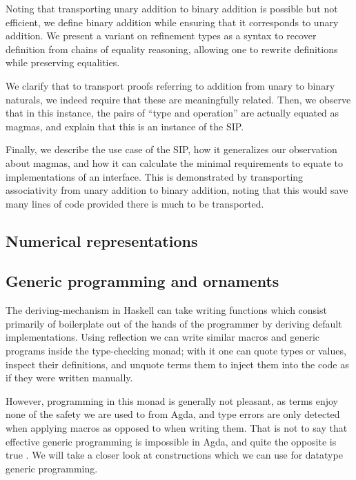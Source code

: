 Noting that transporting unary addition to binary addition is possible but not efficient, we define binary addition while ensuring that it corresponds to unary addition. We present a variant on refinement types as a syntax to recover definition from chains of equality reasoning, allowing one to rewrite definitions while preserving equalities.

We clarify that to transport proofs referring to addition from unary to binary naturals, we indeed require that these are meaningfully related. Then, we observe that in this instance, the pairs of ``type and operation'' are actually equated as magmas, and explain that this is an instance of the SIP.

Finally, we describe the use case of the SIP, how it generalizes our observation about magmas, and how it can calculate the minimal requirements to equate to implementations of an interface. This is demonstrated by transporting associativity from unary addition to binary addition, noting that this would save many lines of code provided there is much to be transported.






\subsection{Numerical representations}

\subsection{Generic programming and ornaments}\label{ssec:bg-desc}
The deriving-mechanism in Haskell can take writing functions which consist primarily of boilerplate out of the hands of the programmer by deriving default implementations. Using reflection we can write similar macros and generic programs inside the type-checking monad; with it one can quote types or values, inspect their definitions, and unquote terms them to inject them into the code as if they were written manually.

However, programming in this monad is generally not pleasant, as terms enjoy none of the safety we are used to from Agda, and type errors are only detected when applying macros as opposed to when writing them. That is not to say that effective generic programming is impossible in Agda, and quite the opposite is true \cite{practgen}. We will take a closer look at constructions which we can use for datatype generic programming. 







